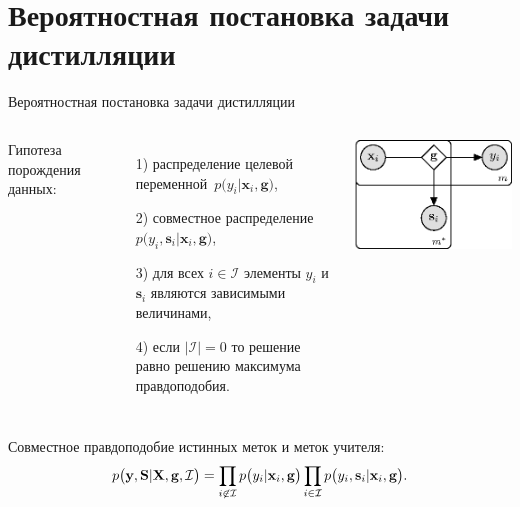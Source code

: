 \documentclass[10pt,pdf,hyperref={unicode}]{beamer}
\begin{document}
\section{Вероятностная постановка задачи дистилляции}
\begin{frame}{Вероятностная постановка задачи дистилляции}
\bigskip
\begin{columns}
Гипотеза порождения данных:
\begin{enumerate}
	\item[1)] распределение целевой переменной~$p\bigr(y_i|\mathbf{x}_i, \mathbf{g}\bigr)$,
	\item[2)] совместное распределение~$p\bigr(y_i, \mathbf{s}_i|\mathbf{x}_i, \mathbf{g}\bigr)$,
	\item[3)] для всех $i \in \mathcal{I}$ элементы $y_i$ и $\mathbf{s}_i$ являются зависимыми величинами,
	\item[4)] если $|\mathcal{I}|=0$ то решение равно решению максимума правдоподобия.
\end{enumerate}
\includegraphics[width=\textwidth]{figures/proba_model}
\end{columns}

\bigskip
Совместное правдоподобие истинных меток и меток учителя:
\[
\setlength\abovedisplayskip{0pt}
p\bigr(\mathbf{y}, \mathbf{S}|\mathbf{X}, \mathbf{g}, \mathcal{I}\bigr)=\prod_{i\not\in \mathcal{I}}p\bigr(y_i|\mathbf{x}_i, \mathbf{g}\bigr)\prod_{i\in \mathcal{I}}p\bigr(y_i, \mathbf{s}_i|\mathbf{x}_i, \mathbf{g}\bigr).
\setlength\belowdisplayskip{0pt}
\]


\end{frame}
\end{document}
